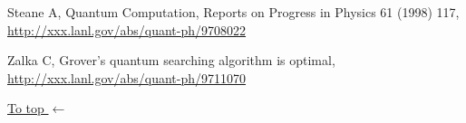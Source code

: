 \documentclass{article}
\def\tthdump#1{#1}
\begin{document}
Steane A,
Quantum Computation, Reports on Progress in Physics 61 (1998) 117,
\hyperref{http://xxx.lanl.gov/abs/quant-ph/9708022}{}{}
{http://xxx.lanl.gov/abs/quant-ph/9708022}

Zalka C, 
Grover's quantum searching algorithm is optimal,
\hyperref{http://xxx.lanl.gov/abs/quant-ph/9711070}{}{}
{http://xxx.lanl.gov/abs/quant-ph/9711070}

\tthdump{\hyperlink{Our general topics:}{\hfil To top $\leftarrow$}}
\end{document}
